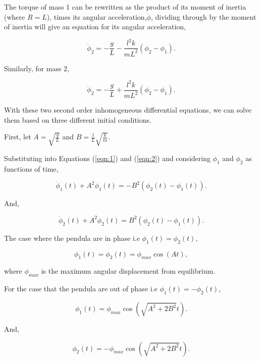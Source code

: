 \documentclass{article}
\begin{document}
The torque of mass 1 can be rewritten as the product of its moment
of inertia (where $R = L$), times its angular acceleration,$\ddot{\phi}$, 
dividing through by the moment of inertia will give an equation for its 
angular acceleration,

\begin{equation} \label{eqn:1}
    \ddot{\phi}_2 = -\frac{g}{L} - \frac{l^2k}{mL^2}(\phi_2-\phi_1). 
\end{equation}

Similarly, for mass 2,

\begin{equation} \label{eqn:2}
    \ddot{\phi}_2 = -\frac{g}{L} + \frac{l^2k}{mL^2}(\phi_2-\phi_1).
\end{equation}

With these two second order inhomogeneous differential equations, we
can solve them based on three different initial conditions. 

First, let $A = \sqrt{\frac{g}{L}}$ and $B=\frac{l}{L}\sqrt{\frac{k}{m}}$.

Substituting into Equations (\ref{eqn:1}) and (\ref{eqn:2}) and
considering $\phi_1$ and $\phi_2$ as functions of time,

\begin{equation}
    \ddot{\phi}_1(t) + A^2\phi_1(t) = -B^2(\phi_2(t)-\phi_1(t)).
\end{equation}

And,

\begin{equation}
    \ddot{\phi}_2(t) + A^2\phi_2(t) = B^2(\phi_2(t)-\phi_1(t)).
\end{equation}

The case where the pendula are in phase i.e $\phi_1(t) = \phi_2(t)$, 

\begin{equation} 
    \phi_1(t) = \phi_2(t) = \phi_{max}\cos{(At)},
\end{equation}

where $\phi_{max}$ is the maximum angular displacement from equilibrium.

For the case that the pendula are out of phase i.e $\phi_1(t) = -\phi_2(t)$,

\begin{equation} 
    \phi_1(t) = \phi_{max}\cos{\left(\sqrt{A^2+2B^2}t\right)}.
\end{equation}

And,

\begin{equation} 
    \phi_2(t) = -\phi_{max}\cos{\left(\sqrt{A^2+2B^2}t\right)}.
\end{equation}
\end{document}
